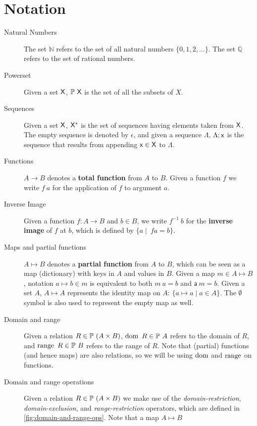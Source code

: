 \section{Notation}\label{sec:notation}

\begin{description}
\item[Natural Numbers] The set $\mathbb{N}$ refers to the set of all natural
  numbers $\{0, 1, 2, \ldots\}$. The set $\mathbb{Q}$ refers to the set of
  rational numbers.
\item[Powerset] Given a set $\mathsf{X}$, $\mathbb{P}~\mathsf{X}$ is the set of all
  the subsets of $X$.
\item[Sequences] Given a set $\mathsf{X}$, $\mathsf{X}^{*}$ is the set of
  sequences having elements taken from $\mathsf{X}$. The empty sequence is
  denoted by $\epsilon$, and given a sequence $\Lambda$, $\Lambda; \mathsf{x}$ is
  the sequence that results from appending $\mathsf{x} \in \mathsf{X}$ to
  $\Lambda$.
\item[Functions] $A \to B$ denotes a \textbf{total function} from $A$ to $B$.
  Given a function $f$ we write $f~a$ for the application of $f$ to argument
  $a$.
\item[Inverse Image] Given a function $f: A \to B$ and $b\in B$, we write
  $f^{-1}~b$ for the \textbf{inverse image} of $f$ at $b$, which is defined by
  $\{a \mid\ f a =  b\}$.
\item[Maps and partial functions] $A \mapsto B$ denotes a \textbf{partial
    function} from $A$ to $B$, which can be seen as a map (dictionary) with
  keys in $A$ and values in $B$. Given a map $m \in A \mapsto B$, notation
  $a \mapsto b \in m$ is equivalent to both $m~ a = b$ and $\mathsf{a}~m = b$.
  Given a set $A$, $A \mapsto A$ represents the identity map on $A$:
  $\{a \mapsto a \mid a \in A\}$. The $\emptyset$ symbol is also used to
  represent the empty map as well.
\item[Domain and range] Given a relation $R \in \mathbb{P}~(A \times B)$,
  $\operatorname{dom}~R \in \mathbb{P}~A$ refers to the domain of $R$, and
  $\operatorname{range}~R \in \mathbb{P}~B$ refers to the range of $R$. Note that (partial)
  functions (and hence maps) are also relations, so we will be using $\operatorname{dom}$ and
  $\operatorname{range}$ on functions.
\item[Domain and range operations] Given a relation
  $R \in \mathbb{P}~(A \times B)$ we make use of the \textit{domain-restriction},
  \textit{domain-exclusion}, and \textit{range-restriction} operators, which
  are defined in \cref{fig:domain-and-range-ops}. Note that a map $A \mapsto B$

\end{description}
